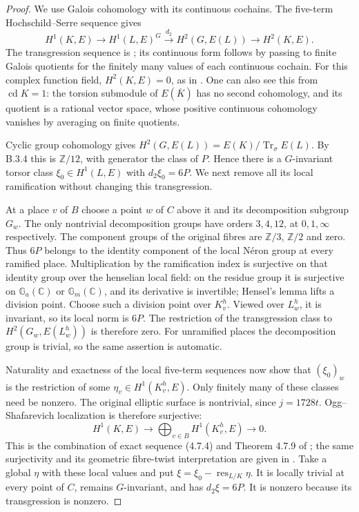 \begin{proof}
We use Galois cohomology with its
continuous cochains. The five-term
Hochschild--Serre sequence gives
\[
 H^1(K,E)\longrightarrow H^1(L,E)^G
 \xrightarrow{\ d_2\ }H^2(G,E(L))
 \longrightarrow H^2(K,E).
\]
The transgression sequence is
\cite[Chapter III, Section 4, Theorem 2
and the following remark, pp.129--130]{HS53};
its continuous form follows by passing
to finite Galois quotients for the
finitely many values of each continuous
cochain. For this complex function field,
$H^2(K,E)=0$, as in
\cite[Lemma 4.7.8]{CDL24}.
One can also see this from
$\operatorname{cd}K=1$: the torsion
submodule of $E(\overline K)$ has no
second cohomology, and its quotient is
a rational vector space, whose positive
continuous cohomology vanishes by
averaging on finite quotients.

Cyclic group cohomology gives
$H^2(G,E(L))=E(K)/\operatorname{Tr}_\sigma E(L)$.
By B.3.4 this is $\mathbb Z/12$, with
generator the class of $P$. Hence there
is a $G$-invariant torsor class
$\xi_0\in H^1(L,E)$ with $d_2\xi_0=6P$.
We next remove all its local ramification
without changing this transgression.

At a place $v$ of $B$ choose a point
$w$ of $C$ above it and its decomposition
subgroup $G_w$. The only nontrivial
decomposition groups have orders
$3,4,12$, at $0,1,\infty$ respectively.
The component groups of the original
fibres are $\mathbb Z/3$, $\mathbb Z/2$
and zero. Thus $6P$ belongs to the
identity component of the local N\'eron
group at every ramified place.
Multiplication by the ramification
index is surjective on that identity
group over the henselian local field:
on the residue group it is surjective
on $\mathbb G_a(\mathbb C)$ or
$\mathbb G_m(\mathbb C)$, and its
derivative is invertible; Hensel's
lemma lifts a division point.
Choose such a division point over
$K_v^h$. Viewed over $L_w^h$, it is
invariant, so its local norm is $6P$.
The restriction of the transgression
class to $H^2(G_w,E(L_w^h))$ is
therefore zero. For unramified places
the decomposition group is trivial,
so the same assertion is automatic.

Naturality and exactness of the local
five-term sequences now show that
$(\xi_0)_w$ is the restriction of some
$\eta_v\in H^1(K_v^h,E)$.
Only finitely many of these classes
need be nonzero. The original elliptic
surface is nontrivial, since
$j=1728t$. Ogg--Shafarevich localization
is therefore surjective:
\[
 H^1(K,E)\longrightarrow
 \bigoplus_{v\in B}H^1(K_v^h,E)
 \longrightarrow0.
\]
This is the combination of exact
sequence (4.7.4) and Theorem 4.7.9
of \cite{CDL24}; the same surjectivity
and its geometric fibre-twist
interpretation are given in
\cite[Section 4, equation (4)]{Xiao91}.
Take a global $\eta$ with these local
values and put
$\xi=\xi_0-\operatorname{res}_{L/K}\eta$.
It is locally trivial at every point
of $C$, remains $G$-invariant, and has
$d_2\xi=6P$. It is nonzero because its
transgression is nonzero.


\end{proof}
